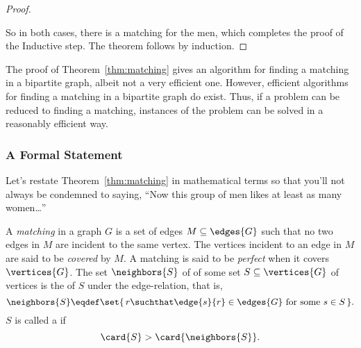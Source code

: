 \begin{proof}
\begin{description}
\iffalse
We can also match the rest of the men by induction if we show that
  the matching condition holds for the remaining men and women.  To
  check the matching condition for the remaining people, consider an
  arbitrary subset of the remaining men $X' \subseteq (M - X)$, and
  let $Y'$ be the set of remaining women that they like.  We must show
  that $\card{X'} \leq \card{Y'}$.  Originally, the combined set of
  men $X \cup X'$ liked the set of women $Y \cup Y'$.  So, by the
  matching condition, we know:
%
  \begin{equation*}
  \card{X \cup X'}  \leq  \card{Y \cup Y'}
  \end{equation*}
%
  We sent away $\card{X}$ men from the set on the left (leaving $X'$)
  and sent away an equal number of women from the set on the right
  (leaving $Y'$).  Therefore, it must be that $\card{X'} \leq
  \card{Y'}$ as claimed.
\fi

\end{description}

So in both cases, there is a matching for the men, which completes the
proof of the Inductive step.  The theorem follows by induction.
\end{proof}

The proof of Theorem~\ref{thm:matching} gives an algorithm for finding
a matching in a bipartite graph, albeit not a very efficient one.
However, efficient algorithms for finding a matching in a bipartite
graph do exist.  Thus, if a problem can be reduced to finding a
matching, instances of the problem can be solved in a reasonably
efficient way.

\subsubsection{A Formal Statement}

Let's restate Theorem~\ref{thm:matching} in mathematical terms so that
you'll not always be condemned to saying, ``Now this group of men
likes at least as many women\dots''

\begin{definition}\label{def:5K}
A \emph{matching}  in a graph $G$ is a set of
edges $M \subseteq \edges{G}$ such that no two edges in $M$ are
incident to the same vertex.  The vertices incident to an edge in $M$
are said to be \emph{covered} 
 by $M$.  A matching is said to be
\emph{perfect} when it covers $\vertices{G}$.  The set $\neighbors{S}$ of
 of some set $S \subseteq \vertices{G}$ of vertices is
the  of $S$ under the edge-relation, \iffalse set of all
vertices adjacent to some vertex in $S$.  \fi that is,
\[
\neighbors{S} \eqdef \set{\,r \suchthat \edge{s}{r} \in \edges{G} \text{ for
    some } s \in S\,}.
\]
$S$ is called a  if
\[
\card{S} > \card{\neighbors{S}}.
\]
\end{definition}

